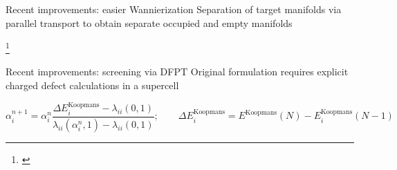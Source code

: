 \documentclass[xcolor=table,aspectratio=169]{beamer}
\newcommand\blfootcite[1]{%
  \begingroup
  \renewcommand\thefootnote{}\footnote{\hspace{-4ex}\cite{#1}}%
  \addtocounter{footnote}{-1}%
  \endgroup
}
\numberwithin{equation}{section}
\begin{document}
\begin{frame}{Recent improvements: easier Wannierization}
   Separation of target manifolds via parallel transport to obtain separate occupied and empty manifolds

      \begin{figure}
      \end{figure}

   \blfootcite{Qiao2023a}
\end{frame}


\begin{frame}{Recent improvements: screening via DFPT}
   Original formulation requires explicit charged defect calculations in a supercell

   \begin{equation*}
   \alpha^{n+1}_i =
   \alpha^n_i \frac{\Delta E^\text{Koopmans}_i - \lambda_{ii}(0, 1)}{\lambda_{ii}(\alpha^n_i, 1) - \lambda_{ii}(0, 1)}; \qquad  \Delta E^\text{Koopmans}_i = E^\text{Koopmans}(N) - E^\text{Koopmans}_i(N - 1)
   \end{equation*}

   

\end{frame}
\end{document}
